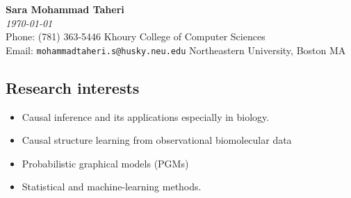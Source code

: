 \documentclass[11pt]{article}
\newcommand{\place}[1]{{\sc #1}}
\begin{document}
\vspace{-2cm}

\begin{center}{\Large \bf \sc Sara Mohammad Taheri}\\[.18cm] {\it \today} \\[.3cm]
Phone: (781) 363-5446 
\hfill Khoury College of Computer Sciences \\
Email: {\tt mohammadtaheri.s@husky.neu.edu} 
\hfill \place{Northeastern University}, Boston MA \\[-2cm]
\end{center}\hrulefill

\def\todo#1{{\color{red}[TODO: #1]}}


\vspace{-.9cm}

\subsection*{Research interests}

\begin{itemize}
\vspace{-.5cm}
\item Causal inference and its applications especially in biology.
\vspace{-.3cm}
\item Causal structure learning from observational biomolecular data
\vspace{-.3cm}
\item Probabilistic graphical models (PGMs)
\vspace{-.3cm}
\item Statistical and machine-learning methods.
\end{itemize}



\vspace{-1cm}
\end{document}
